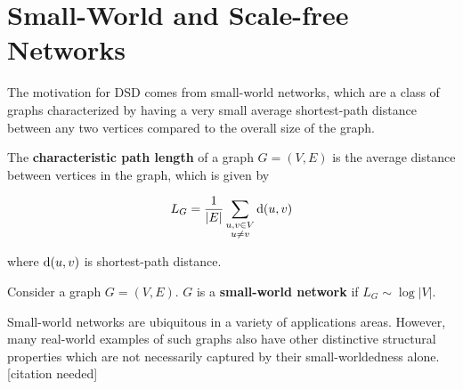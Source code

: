 





\section{Small-World and Scale-free Networks}

The motivation for DSD comes from small-world networks, which are a class of
graphs characterized by having a very small average shortest-path distance
between any two vertices compared to the overall size of the graph.


\begin{definition}
  The \textbf{characteristic path length} of a graph $G = (V,E)$ is the average
  distance between vertices in the graph, which is given by

  \[ L_G = \frac{1}{|E|} \sum_{\substack{u,v \in V \\ u \neq v}} \mathrm{d}(u,v)\]

  where $\mathrm{d}(u,v)$ is shortest-path distance. 
\end{definition}

\begin{definition}
  Consider a graph $G = (V,E)$. $G$ is a \textbf{small-world network} if
  $L_G \sim \log{|V|}$.
\end{definition}

Small-world networks are ubiquitous in a variety of applications areas. However,
many real-world examples of such graphs also have other distinctive structural
properties which are not necessarily captured by their small-worldedness alone.
[citation needed]




